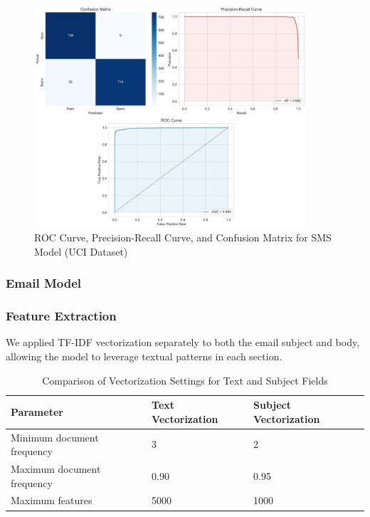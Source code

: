 \documentclass{article}
\begin{document}
\begin{figure}[htbp]
    \centering
    \includegraphics[width=0.9\textwidth]{../analysis/sms/randomforest/uci/combined_metrics.png}
    \caption{ROC Curve, Precision-Recall Curve, and Confusion Matrix for SMS Model (UCI Dataset)}
    \label{fig:combined_metrics_3}
\end{figure}

\newpage

\subsubsection{Email Model}
\subsubsection*{Feature Extraction}
We applied TF-IDF vectorization separately to both the email subject and body, allowing the model to leverage textual patterns in each section.
\newline
\newline

\begin{table}[H]
\renewcommand{\arraystretch}{1.3}
\setlength{\tabcolsep}{12pt}
\centering
\begin{tabular}{|p{6cm}|p{5cm}|p{4cm}|}
\hline
\textbf{Parameter} & \textbf{Text Vectorization} & \textbf{Subject Vectorization} \\
\hline
Minimum document frequency & 3 & 2 \\
\hline
Maximum document frequency & 0.90 & 0.95 \\
\hline
Maximum features & 5000 & 1000 \\
\hline
\end{tabular}
\caption{Comparison of Vectorization Settings for Text and Subject Fields}
\label{tab:vectorization_settings}
\end{table}
\end{document}
